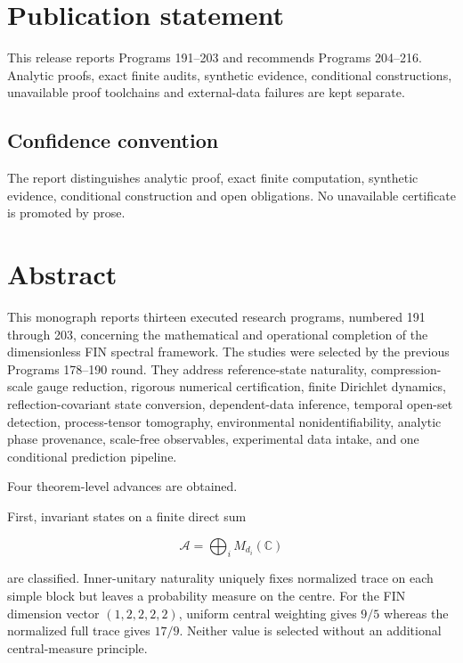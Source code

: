 \documentclass[11pt,a4paper,openany]{report}
\begin{document}
\chapter*{Publication statement}
This release reports Programs 191--203 and recommends Programs 204--216.
Analytic proofs, exact finite audits, synthetic evidence, conditional
constructions, unavailable proof toolchains and external-data failures are
kept separate.

\tableofcontents
\clearpage
{}

\section{Confidence convention}

The report distinguishes analytic proof, exact finite computation, synthetic evidence, conditional construction and open obligations. No unavailable certificate is promoted by prose.

\chapter{Abstract}

This monograph reports thirteen executed research programs, numbered 191 through 203, concerning the mathematical and operational completion of the dimensionless FIN spectral framework. The studies were selected by the previous Programs 178--190 round. They address reference-state naturality, compression-scale gauge reduction, rigorous numerical certification, finite Dirichlet dynamics, reflection-covariant state conversion, dependent-data inference, temporal open-set detection, process-tensor tomography, environmental nonidentifiability, analytic phase provenance, scale-free observables, experimental data intake, and one conditional prediction pipeline.

Four theorem-level advances are obtained.

First, invariant states on a finite direct sum

\[
\mathcal A=\bigoplus_i M_{d_i}(\mathbb C)
\]

are classified. Inner-unitary naturality uniquely fixes normalized trace on each simple block but leaves a probability measure on the centre. For the FIN dimension vector \((1,2,2,2,2)\), uniform central weighting gives \(9/5\) whereas the normalized full trace gives \(17/9\). Neither value is selected without an additional central-measure principle.
\end{document}
